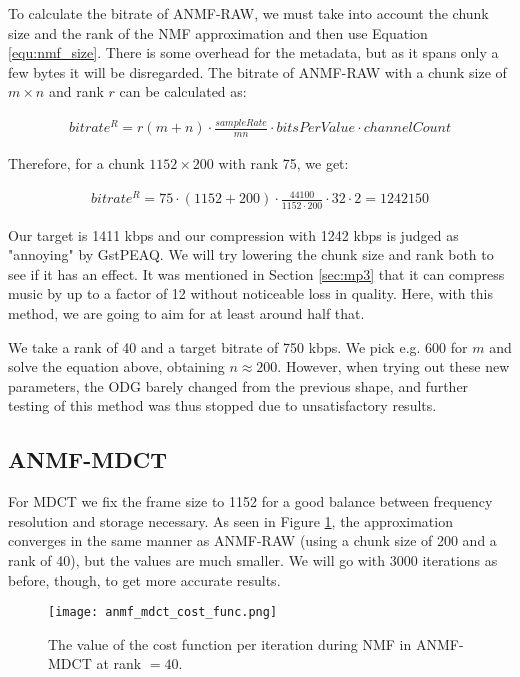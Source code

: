 To calculate the bitrate of ANMF-RAW, we must take into account the chunk size and the rank of the NMF approximation and then use Equation \ref{equ:nmf_size}. There is some overhead for the metadata, but as it spans only a few bytes it will be disregarded. The bitrate of ANMF-RAW with a chunk size of $m \times n$ and rank $r$ can be calculated as:

\begin{align}
bitrate^R = r(m+n) \cdot \frac{sampleRate}{mn} \cdot bitsPerValue \cdot channelCount
\end{align}

Therefore, for a chunk $1152 \times 200$ with rank 75, we get:

\begin{align}
bitrate^R = 75 \cdot (1152 + 200) \cdot \frac{44100}{1152 \cdot 200} \cdot 32 \cdot 2 = 1242150
\end{align}

Our target is 1411 kbps and our compression with 1242 kbps is judged as "annoying" by GstPEAQ. We will try lowering the chunk size and rank both to see if it has an effect. It was mentioned in Section \ref{sec:mp3} that it can compress music by up to a factor of 12 without noticeable loss in quality. Here, with this method, we are going to aim for at least around half that.

We take a rank of 40 and a target bitrate of 750 kbps. We pick e.g. $600$ for $m$ and solve the equation above, obtaining $n \approx 200$. However, when trying out these new parameters, the ODG barely changed from the previous shape, and further testing of this method was thus stopped due to unsatisfactory results.

\subsection{ANMF-MDCT}
For MDCT we fix the frame size to 1152 for a good balance between frequency resolution and storage necessary. As seen in Figure \ref{fig:anmf_mdct_cost_func}, the approximation converges in the same manner as ANMF-RAW (using a chunk size of 200 and a rank of 40), but the values are much smaller. We will go with 3000 iterations as before, though, to get more accurate results.

\begin{figure}[ht]
	\caption[ANMF-MDCT cost function]{The value of the cost function per iteration during NMF in ANMF-MDCT at rank $= 40$.}
	\label{fig:anmf_mdct_cost_func}
	\centering
	\texttt{[image: anmf\_mdct\_cost\_func.png]}
\end{figure}

